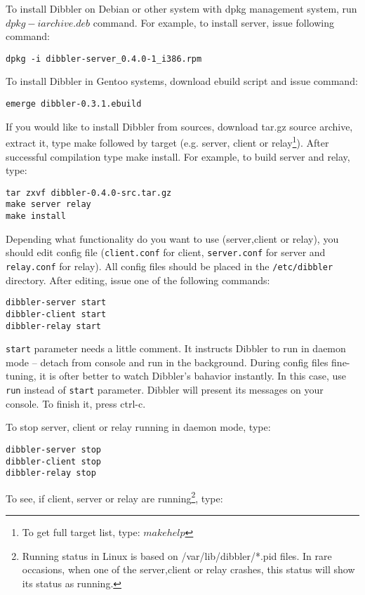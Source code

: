To install Dibbler on Debian or other system with dpkg management
system, run $dpkg -i archive.deb$ command. For example, to install
server, issue following command:

\begin{verbatim}
dpkg -i dibbler-server_0.4.0-1_i386.rpm 
\end{verbatim}

To install Dibbler in Gentoo systems, download ebuild script and issue
command:

\begin{verbatim}
emerge dibbler-0.3.1.ebuild
\end{verbatim}

If you would like to install Dibbler from sources, download tar.gz
source archive, extract it, type make followed by target (e.g. server,
client or relay\footnote{To get full target list, type: $make
  help$}). After successful compilation type make install. For
example, to build server and relay, type:

\begin{verbatim}
tar zxvf dibbler-0.4.0-src.tar.gz
make server relay
make install
\end{verbatim}

Depending what functionality do you want to use (server,client or relay),
you should edit config file (\verb+client.conf+ for client, \verb+server.conf+
for server and \verb+relay.conf+ for relay). All config files should
be placed in the \verb+/etc/dibbler+ directory. After editing, issue one of
the following commands:

\begin{verbatim}
dibbler-server start
dibbler-client start
dibbler-relay start
\end{verbatim}

\verb+start+ parameter needs a little comment. It
instructs Dibbler to run in daemon mode -- detach from console and run
in the background. During config files fine-tuning, it is ofter better
to watch Dibbler's bahavior instantly. In this case, use \verb+run+
instead of \verb+start+ parameter. Dibbler will present its messages on
your console. To finish it, press ctrl-c.

To stop server, client or relay running in daemon mode, type:
\begin{verbatim}
dibbler-server stop
dibbler-client stop
dibbler-relay stop
\end{verbatim}

To see, if client, server or relay are running\footnote{Running status
  in Linux is based on /var/lib/dibbler/*.pid files. In rare
  occasions, when one of the server,client or relay crashes, this
  status will show its status as running.}, type:

